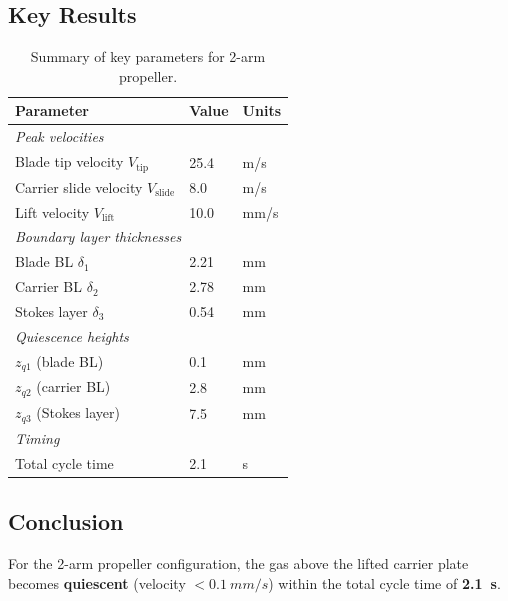 \documentclass[11pt,a4paper]{article}
\begin{document}
\subsection{Key Results}

\begin{table}[H]
\centering
\caption{Summary of key parameters for 2-arm propeller.}
\label{tab:summary}
\begin{tabular}{lll}
\toprule
Parameter & Value & Units \\
\midrule
\multicolumn{3}{l}{\textit{Peak velocities}} \\
Blade tip velocity $V_\mathrm{tip}$ & 25.4 & m/s \\
Carrier slide velocity $V_\mathrm{slide}$ & 8.0 & m/s \\
Lift velocity $V_\mathrm{lift}$ & 10.0 & mm/s \\
\midrule
\multicolumn{3}{l}{\textit{Boundary layer thicknesses}} \\
Blade BL $\delta_1$ & 2.21 & mm \\
Carrier BL $\delta_2$ & 2.78 & mm \\
Stokes layer $\delta_3$ & 0.54 & mm \\
\midrule
\multicolumn{3}{l}{\textit{Quiescence heights}} \\
$z_{q1}$ (blade BL) & 0.1 & mm \\
$z_{q2}$ (carrier BL) & 2.8 & mm \\
$z_{q3}$ (Stokes layer) & 7.5 & mm \\
\midrule
\multicolumn{3}{l}{\textit{Timing}} \\
Total cycle time & 2.1 & s \\
\bottomrule
\end{tabular}
\end{table}

\subsection{Conclusion}

For the 2-arm propeller configuration, the gas above the lifted carrier
plate becomes \textbf{quiescent} (velocity $< \SI{0.1}{mm/s}$) within the
total cycle time of \textbf{\SI{2.1}{s}}.
\end{document}
